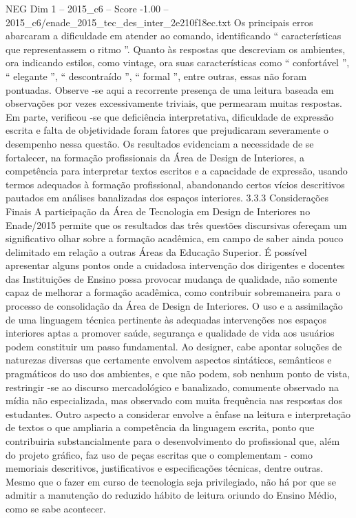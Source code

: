 \begin{textsample}{NEG Dim 1 – 2015\_c6 – Score -1.00 – 2015\_c6/enade\_2015\_tec\_des\_inter\_2e210f18ec.txt}
Os principais erros abarcaram a dificuldade em atender ao comando, identificando “ características que representassem o ritmo ”.
Quanto às respostas que descreviam os ambientes, ora indicando estilos, como vintage, ora suas características como “ confortável ”, “ elegante ”, “ descontraído ”, “ formal ”, entre outras, essas não foram pontuadas.
Observe -se aqui a recorrente presença de uma leitura baseada em observações por vezes excessivamente triviais, que permearam muitas respostas.
Em parte, verificou -se que deficiência interpretativa, dificuldade de expressão escrita e falta de objetividade foram fatores que prejudicaram severamente o desempenho nessa questão.
Os resultados evidenciam a necessidade de se fortalecer, na formação profissionais da Área de Design de Interiores, a competência para interpretar textos escritos e a capacidade de expressão, usando termos adequados à formação profissional, abandonando certos vícios descritivos pautados em análises banalizadas dos espaços interiores. 3.3.3 Considerações Finais A participação da Área de Tecnologia em Design de Interiores no Enade/2015 permite que os resultados das três questões discursivas ofereçam um significativo olhar sobre a formação acadêmica, em campo de saber ainda pouco delimitado em relação a outras Áreas da Educação Superior.
É possível apresentar alguns pontos onde a cuidadosa intervenção dos dirigentes e docentes das Instituições de Ensino possa provocar mudança de qualidade, não somente capaz de melhorar a formação acadêmica, como contribuir sobremaneira para o processo de consolidação da Área de Design de Interiores.
O uso e a assimilação de uma linguagem técnica pertinente às adequadas intervenções nos espaços interiores aptas a promover saúde, segurança e qualidade de vida aos usuários podem constituir um passo fundamental.
Ao designer, cabe apontar soluções de naturezas diversas que certamente envolvem aspectos sintáticos, semânticos e pragmáticos do uso dos ambientes, e que não podem, sob nenhum ponto de vista, restringir -se ao discurso mercadológico e banalizado, comumente observado na mídia não especializada, mas observado com muita frequência nas respostas dos estudantes.
Outro aspecto a considerar envolve a ênfase na leitura e interpretação de textos o que ampliaria a competência da linguagem escrita, ponto que contribuiria substancialmente para o desenvolvimento do profissional que, além do projeto gráfico, faz uso de peças escritas que o complementam - como memoriais descritivos, justificativos e especificações técnicas, dentre outras.
Mesmo que o fazer em curso de tecnologia seja privilegiado, não há por que se admitir a manutenção do reduzido hábito de leitura oriundo do Ensino Médio, como se sabe acontecer.

\end{textsample}
